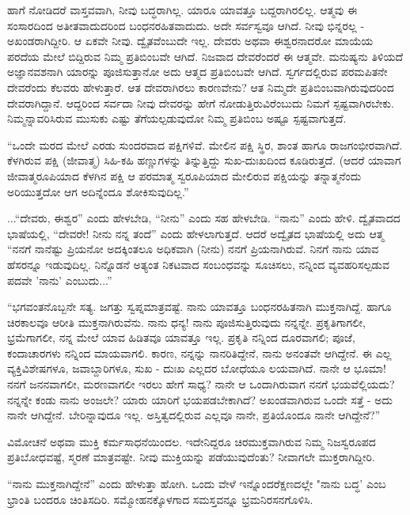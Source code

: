 ಹಾಗೆ ನೋಡಿದರೆ ವಾಸ್ತವವಾಗಿ, ನೀವು ಬದ್ಧರಾಗಿಲ್ಲ. ಯಾರೂ ಯಾವತ್ತೂ ಬದ್ದರಾಗಿರಲಿಲ್ಲ. ಆತ್ಮವು ಈ ಸಂಸಾರದಿಂದ ಅತೀತವಾದುದರಿಂದ ಬಂಧನರಹಿತವಾದುದು. ಅದೇ ಸರ್ವಸ್ವವೂ ಆಗಿದೆ. ನೀವು ಭಿನ್ನರಲ್ಲ - ಅಖಂಡರಾಗಿದ್ದೀರಿ. ಆ ಏಕವೇ ನೀವು. ದ್ವೈತವೆಂಬುದೇ ಇಲ್ಲ. ದೇವರು ಅಥವಾ ಈಶ್ವರನಾದರೋ ಮಾಯೆಯ ಪರದೆಯ ಮೇಲೆ ಬಿದ್ದಿರುವ ನಿಮ್ಮ ಪ್ರತಿಬಿಂಬವೇ ಆಗಿದೆ. ನಿಜವಾದ ದೇವರೆಂದರೆ ಈ ಆತ್ಮವೇ. ಮನುಷ್ಯನು ತಿಳಿಯದೆ ಅಜ್ಞಾನವಶನಾಗಿ ಯಾರನ್ನು ಪೂಜಿಸುತ್ತಾನೋ ಅದು ಆತ್ಮದ ಪ್ರತಿಬಿಂಬವೇ ಆಗಿದೆ. ಸ್ವರ್ಗದಲ್ಲಿರುವ ಪರಮಪಿತನೇ ದೇವರೆಂದು ಕೆಲವರು ಹೇಳುತ್ತಾರೆ. ಆತ ದೇವರಾಗಿರಲು ಕಾರಣವೇನು? ಆತ ನಿಮ್ಮದೇ ಪ್ರತಿಬಿಂಬವಾಗಿರುವುದರಿಂದ ದೇವರಾಗಿದ್ದಾನೆ. ಆದ್ದರಿಂದ ಸರ್ವದಾ ನೀವು ದೇವರನ್ನು ಹೇಗೆ ನೋಡುತ್ತಿರುವಿರೆಂಬುದು ನಿಮಗೆ ಸ್ಪಷ್ಟವಾಗಿರಬೇಕು. ನಿಮ್ಮನ್ನಾವರಿಸಿರುವ ಮುಸುಕು ಎಷ್ಟು ತೆಗೆಯಲ್ಪಡುವುದೋ ನಿಮ್ಮ ಪ್ರತಿಬಿಂಬ ಅಷ್ಟೂ ಸ್ಪಷ್ಟವಾಗುತ್ತದೆ.

“ಒಂದೇ ಮರದ ಮೇಲೆ ಎರಡು ಸುಂದರವಾದ ಪಕ್ಷಿಗಳಿವೆ. ಮೇಲಿನ ಪಕ್ಷಿ ಸ್ಥಿರ, ಶಾಂತ ಹಾಗೂ ರಾಜಗಂಭೀರವಾಗಿದೆ. ಕೆಳಗಿರುವ ಪಕ್ಷಿ (ಜೀವಾತ್ಮ) ಸಿಹಿ-ಕಹಿ ಹಣ್ಣುಗಳನ್ನು ತಿನ್ನುತ್ತಿದ್ದು ಸುಖ-ದುಃಖದಿಂದ ಕೂಡಿರುತ್ತದೆ. (ಆದರೆ ಯಾವಾಗ ಜೀವಾತ್ಮರೂಪಿಯಾದ ಕೆಳಗಿನ ಪಕ್ಷಿ ಆ ಪರಮಾತ್ಮ ಸ್ವರೂಪಿಯಾದ ಮೇಲಿರುವ ಪಕ್ಷಿಯನ್ನು ತನ್ನಾತ್ಮನೆಂದು ಅರಿಯುತ್ತದೋ ಆಗ ಅದಿನ್ನೆಂದೂ ಶೋಕಿಸುವುದಿಲ್ಲ.”

...“ದೇವರು, ಈಶ್ವರ” ಎಂದು ಹೇಳಬೇಡಿ, “ನೀನು'' ಎಂದು ಸಹ ಹೇಳಬೇಡಿ. “ನಾನು” ಎಂದು ಹೇಳಿ. ದ್ವೈತವಾದದ ಭಾಷೆಯಲ್ಲಿ, “ದೇವರೇ! ನೀನು ನನ್ನ ತಂದೆ” ಎಂದು ಹೇಳಲಾಗುತ್ತದೆ. ಆದರೆ ಅದ್ವೈತದ ಭಾಷೆಯಲ್ಲಿ ಅದು ಆತ್ಮ “ನನಗೆ ನಾನೆಷ್ಟು ಪ್ರಿಯನೋ ಅದಕ್ಕಿಂತಲೂ ಅಧಿಕವಾಗಿ (ನೀನು) ನನಗೆ ಪ್ರಿಯನಾಗಿರುವೆ. ನಿನಗೆ ನಾನು ಯಾವ ಹೆಸರನ್ನೂ ಇಡುವುದಿಲ್ಲ. ನಿನ್ನೊಡನೆ ಅತ್ಯಂತ ನಿಕಟವಾದ ಸಂಬಂಧವನ್ನು ಸೂಚಿಸಲು, ನನ್ನಿಂದ ವ್ಯವಹರಿಸಲ್ಪಡುವ ಪದವೇ 'ನಾನು' ಎಂಬುದು...”

“ಭಗವಂತನೊಬ್ಬನೇ ಸತ್ಯ. ಜಗತ್ತು ಸ್ವಪ್ನಮಾತ್ರವಷ್ಟೆ. ನಾನು ಯಾವತ್ತೂ ಬಂಧನರಹಿತನಾಗಿ ಮುಕ್ತನಾಗಿದ್ದೆ. ಹಾಗೂ ಚಿರಕಾಲವೂ ಆರೀತಿ ಮುಕ್ತನಾಗಿರುವೆನು. ನಾನು ಧನ್ಯ! ನಾನು ಪೂಜಿಸುತ್ತಿರುವುದು ನನ್ನನ್ನೇ. ಪ್ರಕೃತಿಗಾಗಲೀ, ಭ್ರಮೆಗಾಗಲೀ, ನನ್ನ ಮೇಲೆ ಯಾವ ಹಿಡಿತವೂ ಯಾವತ್ತೂ ಇಲ್ಲ. ಪ್ರಕೃತಿ ನನ್ನಿಂದ ದೂರವಾಗಲಿ; ಪೂಜೆ, ಕಂದಾಚಾರಗಳು ನನ್ನಿಂದ ಮಾಯವಾಗಲಿ. ಕಾರಣ, ನನ್ನನ್ನು ನಾನರಿತಿದ್ದೇನೆ, ನಾನು ಅನಂತವೇ ಆಗಿದ್ದೇನೆ. ಈ ಎಲ್ಲ ವ್ಯಕ್ತಿವಿಶೇಷಗಳೂ, ಜವಾಬ್ದಾರಿಗಳೂ, ಸುಖ - ದುಃಖ ಎಲ್ಲದರ ಬೋಧೆಯೂ ಲಯವಾಗಿದೆ. ನಾನೇ ಆ ಭೂಮಾ! ನನಗೆ ಜನನವಾಗಲೀ, ಮರಣವಾಗಲೀ ಇರಲು ಹೇಗೆ ಸಾಧ್ಯ? ನಾನೇ ಆ ಒಂದಾಗಿರುವಾಗ ನನಗೆ ಭಯವೆಲ್ಲಿಯದು? ನನ್ನನ್ನೇ ಕಂಡು ನಾನು ಅಂಜಲೇ? ಯಾರು ಯಾರಿಗೆ ಭಯಪಡಬೇಕಾಗಿದೆ? ಅಖಂಡವಾಗಿರುವ ಒಂದೇ ಸತ್ತೆ - ಅದು ನಾನೇ ಆಗಿದ್ದೇನೆ. ಬೇರಿನ್ನಾವುದೂ ಇಲ್ಲ. ಅಸ್ತಿತ್ವದಲ್ಲಿರುವ ಎಲ್ಲವೂ ನಾನೇ, ಪ್ರತಿಯೊಂದೂ ನಾನೇ ಆಗಿದ್ದೇನೆ?”

ವಿಮೋಚನೆ ಅಥವಾ ಮುಕ್ತಿ ಕರ್ಮಸಾಧನೆಯಿಂದಲ. ಇದೇನಿದ್ದರೂ ಚಿರಮುಕ್ತವಾಗಿರುವ ನಿಮ್ಮ ನಿಜಸ್ವರೂಪದ ಪ್ರತಿಬೋಧವಷ್ಟೆ, ಸ್ಮರಣೆ ಮಾತ್ರವಷ್ಟೇ. ನೀವು ಮುಕ್ತಿಯನ್ನು ಪಡೆಯುವುದೆಂತು? ನೀವಾಗಲೇ ಮುಕ್ತರಾಗಿದ್ದೀರಿ.

“ನಾನು ಮುಕ್ತನಾಗಿದ್ದೇನೆ” ಎಂದು ಹೇಳುತ್ತಾ ಹೋಗಿ. ಒಂದು ವೇಳೆ ಇನ್ನೊಂದರೆಕ್ಷಣದಲ್ಲೇ "ನಾನು ಬದ್ಧ' ಎಂಬ ಭ್ರಾಂತಿ ಬಂದರೂ ಚಿಂತಿಸದಿರಿ. ಸಮ್ಮೋಹನಕ್ಕೊಳಗಾದ ಸಮಸ್ತವನ್ನೂ ಭ್ರಮನಿರಸನಗೊಳಿಸಿ.

